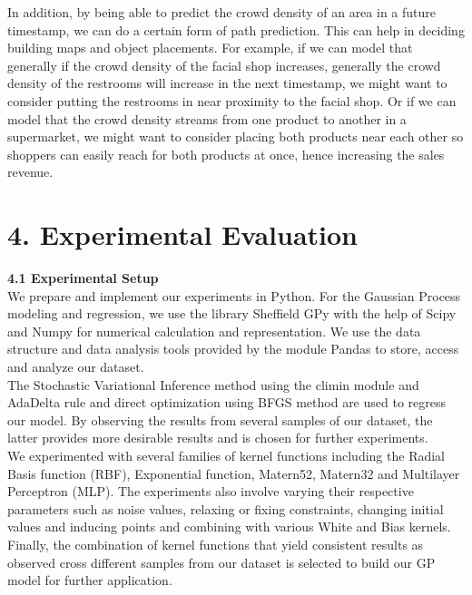 \documentclass[letterpaper]{article}
\begin{document}
In addition, by being able to predict the crowd density of an area in a future timestamp, we can do a certain form of path prediction. This can help in deciding building maps and object placements. For example, if we can model that generally if the crowd density of the facial shop increases, generally the crowd density of the restrooms will increase in the next timestamp, we might want to consider putting the restrooms in near proximity to the facial shop. Or if we can model that the crowd density streams from one product to another in a supermarket, we might want to consider placing both products near each other so shoppers can easily reach for both products at once, hence increasing the sales revenue.  \\

\section{4.  Experimental Evaluation}

{\bf4.1  Experimental Setup} \\

We prepare and implement our experiments in Python. For the Gaussian Process modeling and regression, we use the library Sheffield GPy with the help of Scipy and Numpy for numerical calculation and representation. We use the data structure and data analysis tools provided by the module Pandas to store, access and analyze our dataset. \\

The Stochastic Variational Inference method using the climin module and AdaDelta rule and direct optimization using BFGS method are used to regress our model. By observing the results from several samples of our dataset, the latter provides more desirable results and is chosen for further experiments. \\

We experimented with several families of kernel functions including the Radial Basis function (RBF), Exponential function, Matern52, Matern32 and Multilayer Perceptron (MLP). The experiments also involve varying their respective parameters such as noise values, relaxing or fixing constraints, changing initial values and inducing points and combining with various White and Bias kernels. Finally, the combination of kernel functions that yield consistent results as observed cross different samples from our dataset is selected to build our GP model for further application. \\
\end{document}
